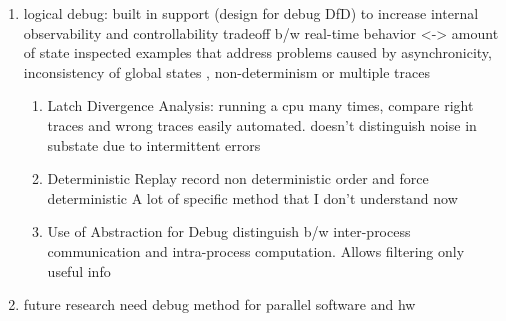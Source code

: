 \documentclass[conference]{IEEEtran}
\begin{document}
\begin{itemize}
\begin {enumerate}
			 	can only access wires close to the surface due to metal layers
			\item logical debug: built in support (design for debug DfD) to increase internal observability and controllability
			 	tradeoff b/w real-time behavior <-> amount of state inspected
			 	examples that address problems caused by asynchronicity, inconsistency of global states , non-determinism or multiple traces
					\begin {enumerate}
			 		\item Latch Divergence Analysis: running a cpu many times, compare right traces and wrong traces
			 			easily automated. doesn't distinguish noise in substate due to intermittent errors
			 		\item Deterministic Replay
			 			record non deterministic order and force deterministic
			 			A lot of specific method that I don't understand now
			 		\item Use of Abstraction for Debug
			 			distinguish b/w inter-process communication and intra-process computation. Allows filtering only useful info
					\end{enumerate}
			\item future research need
				debug method for parallel software and hw
			 \end{enumerate}	 	
\end{itemize}		
\ifCLASSOPTIONcaptionsoff
  \newpage
\fi







%

% 
\end{document}
